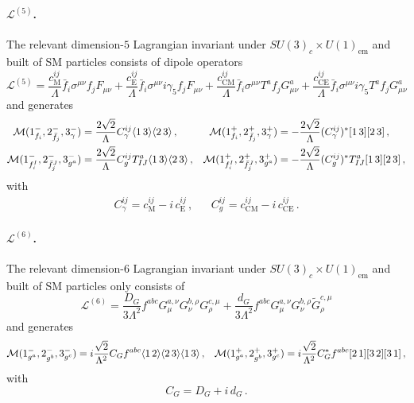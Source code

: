 \paragraph{$\mathcal L^{(5)}$.}
The relevant dimension-$5$ Lagrangian invariant under $SU(3)_c\times U(1)_{\text{em}}$ and built of SM particles consists of dipole operators
\begin{equation}
    \mathcal L^{(5)} = \frac{c_{\text{M}}^{ij}}{\Lambda}\bar f_i \sigma^{\mu\nu} f_j F_{\mu\nu} + \frac{c_{\text{E}}^{ij}}{\Lambda}\bar f_i \sigma^{\mu\nu}i\gamma_5 f_j F_{\mu\nu} + \frac{c_{\text{CM}}^{ij}}{\Lambda}\bar f_i \sigma^{\mu\nu}T^a f_j G^a_{\mu\nu} + \frac{c_{\text{CE}}^{ij}}{\Lambda}\bar f_i \sigma^{\mu\nu}i\gamma_5 T^a f_j G^a_{\mu\nu}
\end{equation}
and generates
\begin{align}
    \mathcal M(1^-_{f_i},2^-_{\bar f_j},3^-_\gamma) &= \frac{2\sqrt 2}{\Lambda}C_\gamma^{ij}\langle1\, 3 \rangle\langle2\, 3 \rangle\,, &
    \mathcal M(1^+_{f_i},2^+_{\bar f_j},3^+_\gamma)&=- \frac{2\sqrt 2}{\Lambda}(C_\gamma^{ij})^*\lbrack 1\, 3 \rbrack\lbrack 2\, 3 \rbrack\,,  \\
    \mathcal M(1^-_{f_i^I},2^-_{\bar f_j^J},3^-_{g^a}) &= \frac{2\sqrt 2}{\Lambda}C_g^{ij}T^a_{IJ}\langle1\, 3 \rangle\langle2\, 3 \rangle\,, &
    \mathcal M(1^+_{f_i^I},2^+_{\bar f_j^J},3^+_{g^a})&= - \frac{2\sqrt 2}{\Lambda}(C_g^{ij})^*T^a_{IJ}\lbrack 1\, 3 \rbrack\lbrack 2\, 3 \rbrack\,,
\end{align}
with
\begin{align}
    C_\gamma^{ij}=c_{\text{M}}^{ij}-i\, c_{\text{E}}^{ij}\,, && C_g^{ij}=c_{\text{CM}}^{ij}-i\,c_{\text{CE}}^{ij}\,.
\end{align}

\paragraph{$\mathcal L^{(6)}$.}
The relevant dimension-$6$ Lagrangian invariant under $SU(3)_c\times U(1)_{\text{em}}$ and built of SM particles only consists of
\begin{equation}
    \mathcal L^{(6)} = \frac{D_G}{3\Lambda^2} f^{abc} G_\mu^{a, \nu} G_{\nu}^{b, \rho} G_{\rho}^{c, \mu} + \frac{d_G}{3\Lambda^2} f^{abc} G_\mu^{a, \nu} G_{\nu}^{b, \rho} \tilde G_{\rho}^{c, \mu}
\end{equation}
and generates
\begin{align}
    \mathcal M(1^-_{g^a},2^-_{g^b},3^-_{g^c}) = i\frac{\sqrt 2}{\Lambda^2}C_Gf^{abc}\langle1\, 2 \rangle\langle2\, 3 \rangle\langle1\, 3 \rangle\,, &&
     \mathcal M(1^+_{g^a},2^+_{g^b},3^+_{g^c}) = i\frac{\sqrt 2}{\Lambda^2}C_G^* f^{abc}\lbrack 2\, 1 \rbrack\lbrack 3\, 2 \rbrack\lbrack 3\, 1 \rbrack\,,
\end{align}
with
\begin{equation}
    C_G= D_G + i\, d_G\,.
\end{equation}

